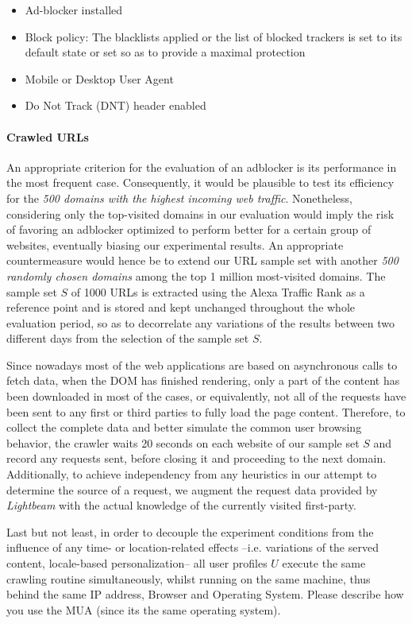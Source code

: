 \documentclass{sig-alternate}
\begin{document}
\begin{itemize}
 \item Ad-blocker installed
 \item Block policy: The blacklists applied or the list of blocked trackers is set to its default state or set so as to provide a maximal protection
 \item Mobile or Desktop User Agent
 \item Do Not Track (DNT) header enabled
\end{itemize}


\paragraph{Crawled URLs}
An appropriate criterion for the evaluation of an adblocker is its performance in the most frequent case. Consequently, it would be plausible to test its efficiency for the \textit{500 domains with the highest incoming web traffic}. Nonetheless, considering only the top-visited domains in our evaluation would imply the risk of favoring an adblocker optimized to perform better for a certain group of websites, eventually biasing our experimental results. An appropriate countermeasure would hence be to extend our URL sample set with another \textit{500 randomly chosen domains} among the top 1 million most-visited domains. The sample set $S$ of 1000 URLs is extracted using the Alexa Traffic Rank as a reference point and is stored and kept unchanged throughout the whole evaluation period, so as to decorrelate any variations of the results between two different days from the selection of the sample set $S$.

Since nowadays most of the web applications are based on asynchronous calls to fetch data, when the DOM has finished rendering, only a part of the content has been downloaded in most of the cases, or equivalently, not all of the requests have been sent to any first or third parties to fully load the page content. Therefore, to collect the complete data and better simulate the common user browsing behavior, the crawler waits 20 seconds on each website of our sample set $S$ and record any requests sent, before closing it and proceeding to the next domain. Additionally, to achieve independency from any heuristics in our attempt to determine the source of a request, we augment the request data provided by \textit{Lightbeam} with the actual knowledge of the currently visited first-party.

Last but not least, in order to decouple the experiment conditions from the influence of any time- or location-related effects --i.e. variations of the served content, locale-based personalization-- all user profiles $U$ execute the same crawling routine simultaneously, whilst running on the same machine, thus behind the same IP address, Browser and Operating System. {\color{red}Please describe how you use the MUA (since its the same operating system).}
\end{document}
